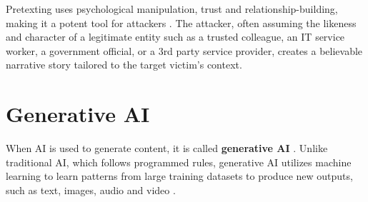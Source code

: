 Pretexting uses psychological manipulation, trust and relationship-building, making it a potent tool for attackers \citep{mitnickArtDeceptionControlling2003}. The attacker, often assuming the likeness and character of a legitimate entity such as a trusted colleague, an IT service worker, a government official, or a 3rd party service provider, creates a believable narrative story tailored to the target victim's context.
















\section{Generative AI}
\begin{comment}

Artificial Intelligence, Generative AI (ChatGPT, etc)

What to cover:
    - Mitä tekoäly oikeastaan edes on?
    - What is Generative AI
    - OpenAI releasing ChatGPT to the public in 2022
    - NLP Natural Language Processing
    
What to skip:
    - GPT:n historian (versiot 1, 2, 3, 3.5 jne) eli keskitytään vain GPT versioon 4 ja uudempiiin
    
\end{comment}

When AI is used to generate content, it is called \textbf{generative AI} \citep{goodfellowGenerativeAdversarialNetworks2020}. Unlike traditional AI, which follows programmed rules, generative AI utilizes machine learning to learn patterns from large training datasets to produce new outputs, such as text, images, audio and video \citep{fakhouriAIDrivenSolutionsForSocialEngineeringAttacks2024}.

